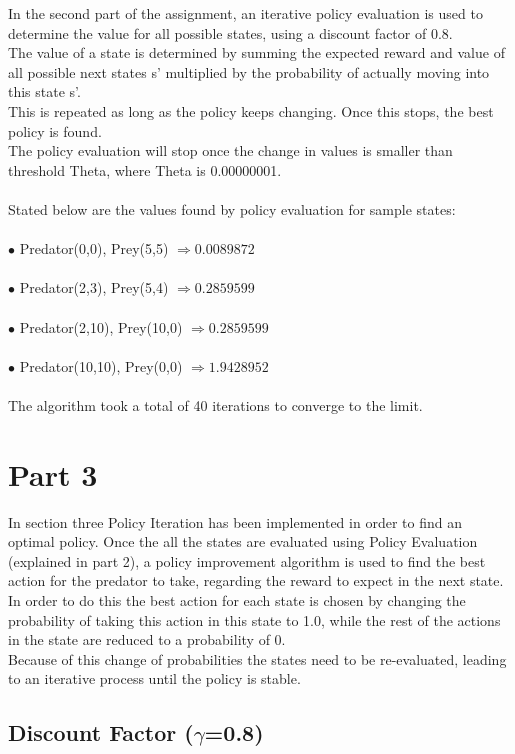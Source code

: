\documentclass[11pt]{article}
\begin{document}
In the second part of the assignment, an iterative policy evaluation is used to determine the value for all possible states, using a discount factor of 0.8.\\
The value of a state is determined by summing the expected reward and value of all possible next states s' multiplied by the probability of actually moving into this state s'.\\
This is repeated as long as the policy keeps changing. Once this stops, the best policy is found.\\
The policy evaluation will stop once the change in values is smaller than threshold Theta, where Theta is 0.00000001.\\\\
Stated below are the values found by policy evaluation for sample states:\\\\
$\bullet$ Predator(0,0), Prey(5,5) $\Rightarrow 0.0089872$\\\\
$\bullet$ Predator(2,3), Prey(5,4) $\Rightarrow  0.2859599$\\\\
$\bullet$ Predator(2,10), Prey(10,0) $\Rightarrow  0.2859599$\\\\
$\bullet$ Predator(10,10), Prey(0,0) $\Rightarrow  1.9428952$\\\\
The algorithm took a total of 40 iterations to converge to the limit.


\section{Part 3}
In section three Policy Iteration has been implemented in order to find an optimal policy.
Once the all the states are evaluated using  Policy Evaluation (explained in part 2), a policy improvement algorithm is used to find the best action for the predator to take, regarding the reward to expect in the next state.\\
In order to do this the best action for each state is chosen by changing the probability of taking this action in this state to 1.0, while the rest of the actions in the state are reduced to a probability of 0. \\
Because of this change of probabilities the states need to be re-evaluated, leading to an iterative process until the policy is stable.


\subsection{Discount Factor ($\gamma$=0.8)}
\end{document}
